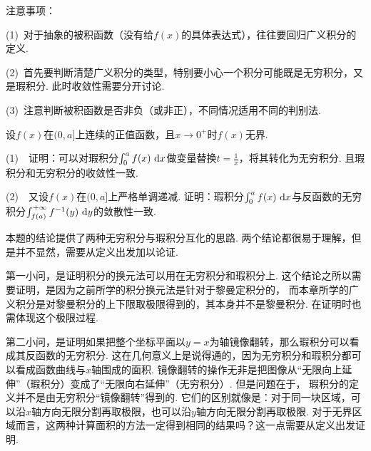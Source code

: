 注意事项：

(1)~对于抽象的被积函数（没有给$f(x)$的具体表达式），往往要回归广义积分的定义.

(2)~首先要判断清楚广义积分的类型，特别要小心一个积分可能既是无穷积分，又是瑕积分.
此时收敛性需要分开讨论.

(3)~注意判断被积函数是否非负（或非正），不同情况适用不同的判别法.

\begin{example}
\label{ex:ch11-01}
设$f(x)$在$(0,a]$上连续的正值函数，且$x \to 0^{+}$时$f(x)$无界.

(1)~~证明：可以对瑕积分$\int_{0}^{a} f(x) ~\mathrm{d} x$做变量替换$t = \frac{1}{x}$，将其转化为无穷积分.
且瑕积分和无穷积分的收敛性一致.

(2)~~又设$f(x)$在$(0,a]$上严格单调递减.
证明：瑕积分$\int_{0}^{a} f(x) ~\mathrm{d} x$与反函数的无穷积分$\int_{f(a)}^{+\infty} f^{-1}(y) ~\mathrm{d} y$的敛散性一致.
\end{example}

\begin{analysis}
本题的结论提供了两种无穷积分与瑕积分互化的思路.
    两个结论都很易于理解，但是并不显然，需要从定义出发加以论证.

    第一小问，是证明积分的换元法可以用在无穷积分和瑕积分上.
    这个结论之所以需要证明，是因为之前所学的积分换元法是针对于黎曼定积分的，
    而本章所学的广义积分是对黎曼积分的上下限取极限得到的，其本身并不是黎曼积分.
    在证明时也需体现这个极限过程.

    第二小问，是证明如果把整个坐标平面以$y=x$为轴镜像翻转，那么瑕积分可以看成其反函数的无穷积分.
    这在几何意义上是说得通的，因为无穷积分和瑕积分都可以看成函数曲线与$x$轴围成的面积.
    镜像翻转的操作无非是把图像从“无限向上延伸”（瑕积分）变成了“无限向右延伸”（无穷积分）.
    但是问题在于，
    瑕积分的定义并不是由无穷积分“镜像翻转”得到的.
    它们的区别就像是：对于同一块区域，可以沿$x$轴方向无限分割再取极限，也可以沿$y$轴方向无限分割再取极限.
    对于无界区域而言，这两种计算面积的方法一定得到相同的结果吗？这一点需要从定义出发证明.
\end{analysis}

